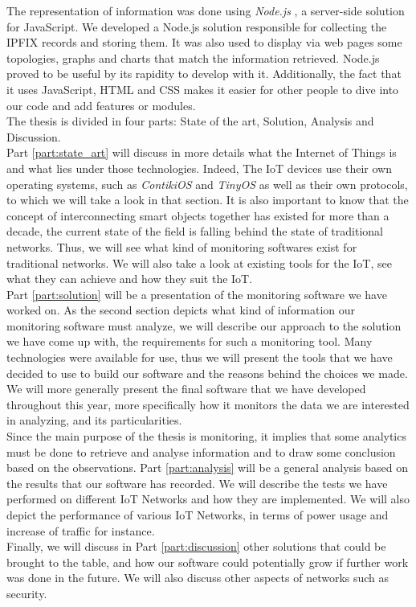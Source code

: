 The representation of information was done using \textit{Node.js} \cite{website:nodejs}, a server-side solution for JavaScript. We developed a Node.js solution responsible for collecting the IPFIX records and storing them. It was also used to display via web pages some topologies, graphs and charts that match the information retrieved. Node.js proved to be useful by its rapidity to develop with it. Additionally, the fact that it uses JavaScript, HTML and CSS makes it easier for other people to dive into our code and add features or modules. \\

The thesis is divided in four parts: State of the art, Solution, Analysis and Discussion.\\

Part \ref{part:state_art} will discuss in more details what the Internet of Things is and what lies under those technologies. Indeed, The IoT devices use their own operating systems, such as \textit{ContikiOS} and \textit{TinyOS} as well as their own protocols, to which we will take a look in that section. It is also important to know that the concept of interconnecting smart objects together has existed for more than a decade, the current state of the field is falling behind the state of traditional networks. Thus, we will see what kind of monitoring softwares exist for traditional networks. We will also take a look at existing tools for the IoT, see what they can achieve and how they suit the IoT.\\

Part \ref{part:solution} will be a presentation of the monitoring software we have worked on. As the second section depicts what kind of information our monitoring software must analyze, we will describe our approach to the solution we have come up with, the requirements for such a monitoring tool. Many technologies were available for use, thus we will present the tools that we have decided to use to build our software and the reasons behind the choices we made. We will more generally present the final software that we have developed throughout this year, more specifically how it monitors the data we are interested in analyzing, and its particularities. \\

Since the main purpose of the thesis is monitoring, it implies that some analytics must be done to retrieve and analyse information and to draw some conclusion based on the observations. Part \ref{part:analysis} will be a general analysis based on the results that our software has recorded. We will describe the tests we have performed on different IoT Networks and how they are implemented. We will also depict the performance of various IoT Networks, in terms of power usage and increase of traffic for instance.\\

Finally, we will discuss in Part \ref{part:discussion} other solutions that could be brought to the table, and how our software could potentially grow if further work was done in the future. We will also discuss other aspects of networks such as security.
